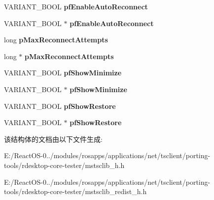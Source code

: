 \begin{DoxyCompactItemize}
V\+A\+R\+I\+A\+N\+T\+\_\+\+B\+O\+OL {\bfseries pf\+Enable\+Auto\+Reconnect}
\item 
\mbox{\label{struct_i_ms_rdp_client_advanced_settings3_vtbl_a03baeb02bb0ca90e324d1d3cd057e477}} 
V\+A\+R\+I\+A\+N\+T\+\_\+\+B\+O\+OL $\ast$ {\bfseries pf\+Enable\+Auto\+Reconnect}
\item 
\mbox{\label{struct_i_ms_rdp_client_advanced_settings3_vtbl_a3a5915b7abb65b907d259219ff604885}} 
long {\bfseries p\+Max\+Reconnect\+Attempts}
\item 
\mbox{\label{struct_i_ms_rdp_client_advanced_settings3_vtbl_a1b51a9fc833f5ad4c1dc6ec195d819dd}} 
long $\ast$ {\bfseries p\+Max\+Reconnect\+Attempts}
\item 
\mbox{\label{struct_i_ms_rdp_client_advanced_settings3_vtbl_a10cca13bd9188d9cff36af283f4abcc1}} 
V\+A\+R\+I\+A\+N\+T\+\_\+\+B\+O\+OL {\bfseries pf\+Show\+Minimize}
\item 
\mbox{\label{struct_i_ms_rdp_client_advanced_settings3_vtbl_a7162942b8c4bd93300cec21a7163b451}} 
V\+A\+R\+I\+A\+N\+T\+\_\+\+B\+O\+OL $\ast$ {\bfseries pf\+Show\+Minimize}
\item 
\mbox{\label{struct_i_ms_rdp_client_advanced_settings3_vtbl_a3e4c88c630787c658069c787c8590f74}} 
V\+A\+R\+I\+A\+N\+T\+\_\+\+B\+O\+OL {\bfseries pf\+Show\+Restore}
\item 
\mbox{\label{struct_i_ms_rdp_client_advanced_settings3_vtbl_aa5593b07264aebc90d890abb4be9a0b8}} 
V\+A\+R\+I\+A\+N\+T\+\_\+\+B\+O\+OL $\ast$ {\bfseries pf\+Show\+Restore}
\end{DoxyCompactItemize}


该结构体的文档由以下文件生成\+:\begin{DoxyCompactItemize}
\item 
E\+:/\+React\+O\+S-\/0../modules/rosapps/applications/net/tsclient/porting-\/tools/rdesktop-\/core-\/tester/mstsclib\+\_\+h.\+h\item 
E\+:/\+React\+O\+S-\/0../modules/rosapps/applications/net/tsclient/porting-\/tools/rdesktop-\/core-\/tester/mstsclib\+\_\+redist\+\_\+h.\+h\end{DoxyCompactItemize}
